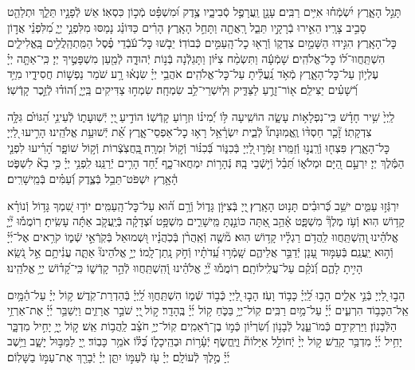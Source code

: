 \documentclass[twoside, openany, parskip=half, 11pt]{book}
\begin{document}
 תָּגֵ֣ל הָאָ֑רֶץ יִ֝שְׂמְֿח֗וּ אִיִּ֥ים רַבִּֽים׃
 עָנָ֣ן וַֽעֲרָפֶ֣ל סְֿבִיבָ֑יו צֶ֥דֶק וּ֝מִשְׁפָּ֗ט מְֿכ֣וֹן כִּסְאֽוֹ׃
 אֵשׁ לְֿפָנָ֣יו תֵּלֵ֑ךְ וּתְלַהֵ֖ט סָבִ֣יב צָרָֽיו׃
 הֵאִ֣ירוּ בְֿרָקָ֣יו תֵּבֵ֑ל רָֽאֲתָ֖ה וַתָּחֵ֣ל הָאָֽרֶץ׃
 הָרִ֗ים כַּדּוֹנַ֗ג נָמַסּוּ מִלִּפְנֵ֣י יְיָ֑ מִ֝לִּפְנֵ֗י אֲד֣וֹן כׇּל־הָאָֽרֶץ׃
 הִגִּ֣ידוּ הַשָּׁמַ֣יִם צִדְק֑וֹ וְֿרָא֖וּ כׇל־הָֽעַמִּ֣ים כְּֿבוֹדֽוֹ׃
 יֵבֹ֤שׁוּ כׇּל־עֹ֬בְֿדֵי פֶ֗סֶל הַמִּֽתְהַֽלֲלִ֥ים בָּֽאֱלִילִ֑ים הִשְׁתַּֽחֲווּ־ל֝וֹ כׇּל־אֱלֹהִֽים׃
 שָׁמְֿעָ֬ה וַתִּשְׂמַ֨ח צִיּ֗וֹן וַתָּגֵלְֿנָה בְּֿנ֣וֹת יְֿהוּדָ֑ה לְֿמַ֖עַן מִשְׁפָּטֶ֣יךָ יְיָ׃
 כִּֽי־אַתָּ֤ה יְיָ֗ עֶלְי֥וֹן עַל־כׇּל־הָאָ֑רֶץ מְֿאֹ֥ד נַֽ֝עֲלֵ֗יתָ עַל־כׇּל־אֱלֹהִֽים׃
 אֹהֲבֵ֥י יְיָ֗ שִׂנְא֫וּ רָ֥ע שֹׁמֵר נַפְשׁ֣וֹת חֲסִידָ֑יו מִיַּ֥ד רְֿ֝שָׁעִ֗ים יַצִּילֵֽם׃
 א֖וֹר־זָרֻ֣עַ לַצַּדִּ֑יק וּֽלְיִשְׁרֵי־לֵ֥ב שִׂמְחָֽה׃
שִׂמְח֣וּ צַדִּיקִים בַּֽיְיָ֑ וְֿ֝הוֹד֗וּ לְֿזֵ֣כֶר קָדְֿשֽׁוֹ׃


 לַֽיְיָ֙ שִׁ֥יר חָדָ֗שׁ כִּֽי־נִפְלָא֥וֹת עָשָׂ֑ה הוֹשִֽׁיעָה לּ֥וֹ יְֿ֝מִינ֗וֹ וּזְר֥וֹעַ קָדְֿשֽׁוֹ׃
 הוֹדִ֣יעַ ֖יְיָ יְֿשֽׁוּעָת֑וֹ לְֿעֵינֵ֥י הַ֝גּוֹיִ֗ם גִּלָּ֥ה צִדְקָתֽוֹ׃
 זָ֘כַ֤ר חַסְדּ֨וֹ וֶֽאֱמֽוּנָתוֹ֘ לְֿבֵ֢ית יִשְׂרָ֫אֵ֥ל רָא֥וּ כׇל־אַפְסֵי־אָ֑רֶץ אֵ֝֗ת יְֿשׁוּעַ֥ת אֱלֹהֵֽינוּ׃
 הָרִ֣יעוּ לַ֭יְיָ כׇּל־הָאָ֑רֶץ פִּצְח֖וּ וְֿרַֽנֲנ֣וּ וְֿזַמֵּֽרוּ׃
 זַמְּֿר֣וּ ֖לַיְיָ בְּֿכִנּ֑וֹר בְּֿ֝כִנּ֗וֹר וְֿק֣וֹל זִמְרָֽה׃
 ֖בַּֽחֲצֹֽצְֿרוֹת וְֿק֣וֹל שׁוֹפָ֑ר הָ֝רִ֗יעוּ לִפְנֵ֤י הַמֶּ֬לֶךְ יְיָ׃
 יִרְעַ֣ם הַ֭יָּם וּמְלֹא֑וֹ תֵּ֝בֵ֗ל וְֿי֣שְֿׁבֵי בָֽהּ׃
 נְֿהָר֥וֹת יִמְחֲאוּ־כָ֑ף יַ֝֗חַד הָרִ֥ים יְֿרַנֵּֽנוּ׃
 לִֽפְנֵ֥י יְיָ֗ כִּ֥י בָא֘ לִשְׁפֹּ֢ט הָ֫אָ֥רֶץ יִשְׁפֹּט־תֵּבֵ֥ל בְּֿצֶ֑דֶק וְֿ֝עַמִּ֗ים בְּֿמֵֽישָׁרִֽים׃

 יִרְגְּֿז֣וּ עַמִּ֑ים ישֵׁ֥ב כְּֿ֝רוּבִ֗ים תָּנ֥וּט הָאָֽרֶץ׃
 ֖יְיָ בְּֿצִיּוֹ֣ן גָּד֑וֹל וְֿרָ֥ם ה֝֗וּא עַל־כׇּל־הָֽעַמִּֽים׃
 יוֹד֣וּ שִׁ֭מְךָ גָּד֥וֹל וְֿנוֹרָ֗א קָד֥וֹשׁ הֽוּא׃
 וְֿעֹ֥ז מֶלֶךְ֘ מִשְׁפָּ֢ט אָ֫הֵ֥ב אַ֭תָּה כּוֹנַ֣נְתָּ מֵּֽישָׁרִ֑ים מִשְׁפָּ֥ט וּ֝צְדָקָ֗ה בְּֿיַֽעֲקֹ֤ב אַתָּ֬ה עָשִֽׂיתָ׃
 רֽוֹמֲמ֡וּ יְ֘יָ֤ אֱלֹהֵ֗ינוּ ֖וְהִֽשְׁתַּֽחֲווּ לַֽהֲדֹ֥ם רַגְלָ֗יו קָד֥וֹשׁ הֽוּא׃
 מ֘שֶׁ֤ה וְֿאַֽהֲרֹ֨ן בְּֿכֹֽהֲנָ֗יו וּ֭שְׁמוּאֵל בְּֿקֹֽרְֿאֵ֣י שְֿׁמ֑וֹ קֹרִ֥אים אֶל־יְ֜יָ֗ וְֿה֣וּא יַֽעֲנֵֽם׃
 בְּֿעַמּ֣וּד עָ֭נָן יְֿדַבֵּ֣ר אֲלֵיהֶ֑ם שָֽׁמְֿר֥וּ עֵֽ֝דֹתָ֗יו וְֿחֹ֣ק נָֽתַן־לָֽמוֹ׃
 יְיָ֣ אֱלֹהֵינוּ֘ אַתָּ֢ה עֲנִ֫יתָ֥ם אֵ֣ל נֹ֭שֵֽׂא הָיִ֣יתָ לָהֶ֑ם וְֿ֝נֹקֵ֗ם עַל־עֲלִֽילוֹתָֽם׃
 רֽוֹמֲמ֡וּ יְ֘יָ֤ אֱלֹהֵ֗ינוּ וְֿ֭הִֽשְׁתַּֽחֲווּ לְֿהַ֣ר קָדְֿשׁ֑וֹ כִּֽי־קָ֝ד֗וֹשׁ יְיָ֥ אֱלֹהֵֽינוּ׃

 הָב֣וּ לַ֭יְיָ בְּֿנֵ֣י אֵלִ֑ים הָב֥וּ לַֽ֝יְיָ֗ כָּב֥וֹד וָעֹֽז׃
 הָב֣וּ לַ֭יְיָ כְּֿב֣וֹד שְֿׁמ֑וֹ הִשְׁתַּֽחֲו֥וּ לַֽ֝יְיָ֗ בְּֿהַדְרַת־קֹֽדֶשׁ׃
 ק֥וֹל יְיָ֗ עַל־הַ֫מָּ֥יִם אֵֽל־הַכָּב֥וֹד הִרְעִ֑ים יְ֜יָ֗ עַל־מַ֥יִם רַבִּֽים׃
 קֽוֹל־יְיָ֥ בַּכֹּ֑חַ ק֥וֹל יְ֜יָ֗ בֶּֽהָדָֽר׃
 ק֣וֹל ֖יְיָ שֹׁבֵ֣ר אֲרָזִ֑ים וַיְשַׁבֵּ֥ר יְ֜יָ֗ אֶת־אַרְזֵ֥י הַלְּֿבָנֽוֹן׃
 וַיַּרְקִידֵ֥ם כְּֿמוֹ־עֵ֑גֶל לְֿבָנ֥וֹן וְֿ֝שִׂרְי֗וֹן כְּֿמ֣וֹ בֶן־רְֿאֵמִֽים׃
 קֽוֹל־יְיָ֥ חֹצֵ֗ב לַֽהֲב֥וֹת אֵֽשׁ׃
 ק֣וֹל יְ֖יָ֥ יָחִ֣יל מִדְבָּ֑ר יָחִ֥יל יְ֜יָ֗ מִדְבַּ֥ר קָדֵֽשׁ׃
 ק֣וֹל יְיָ֨ יְֿחוֹלֵ֣ל אַיָּלוֹת֘ וַיֶּֽחֱשׂ֢ף יְֿעָ֫ר֥וֹת וּבְהֵֽיכָל֑וֹ כֻּ֝לּ֗וֹ אֹמֵ֥ר כָּבֽוֹד׃
 יְ֖יָ לַמַּבּ֣וּל יָשָׁ֑ב וַיֵּ֥שֶׁב יְ֜יָ֗ מֶ֣לֶךְ לְֿעוֹלָֽם׃
יְיָ֗ עֹ֖ז לְֿעַמּ֣וֹ יִתֵּ֑ן יְיָ֓ יְֿבָרֵ֖ךְ אֶת־עַמּ֣וֹ בַשָּׁלֽוֹם׃
\end{document}
